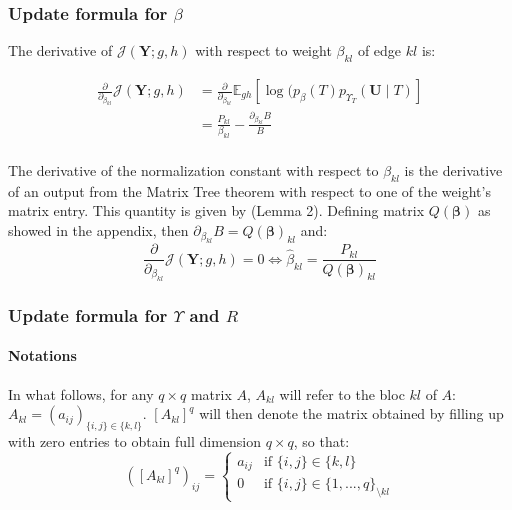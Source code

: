 \documentclass[11pt,a4paper]{article}
\newcommand{\betabf}{\boldsymbol{\beta}}
\newcommand{\Ybf}{\boldsymbol{Y}}
\newcommand{\Ubf}{\boldsymbol{U}}
\newcommand{\Esp}{\mathds{E}}
\begin{document}
 \subsubsection{Update formula for $\beta$}
 The derivative of $ \mathcal{J}(\Ybf ; g,h)$ with respect to weight $\beta_{kl}$ of edge $kl$ is:
 
 \begin{align*}
\frac{\partial}{\partial_{\beta_{kl}}} \mathcal{J}(\Ybf ; g,h) &=  \frac{\partial}{\partial_{\beta_{kl}}} \Esp_{gh} [\log (p_\beta(T)p_{\Upsilon_T}(\Ubf\mid T) ] \\
&= \frac{P_{kl}}{\beta_{kl}} - \frac{\partial_{\beta_{kl}} B }{B} \\
\end{align*}

The derivative of the normalization constant with respect to $\beta_{kl}$ is the derivative of an output from the Matrix Tree theorem with respect to one of the weight's matrix entry. This quantity is given by \citet{Meila} (Lemma 2). Defining matrix $Q(\betabf)$ as showed in the appendix, then $\partial_{\beta_{kl}} B = Q(\betabf)_{kl}$ and:
$$\frac{\partial}{\partial_{\beta_{kl}}} \mathcal{J}(\Ybf ; g,h) 
=0 \iff  \boxed{\widehat{\beta}_{kl} = \frac{P_{kl}}{ Q(\betabf)_{kl}} }$$

 \subsubsection{Update formula for $\Upsilon$ and $R$}
 \paragraph{Notations\\}
In what follows, for any $q\times q$  matrix $A$, $A_{kl}$ will refer to the bloc $kl$ of $A$: $A_{kl}=(a_{ij})_{\{i,j\}\in\{k,l\}}$.   $[A_{kl}]^q$ will then denote the matrix obtained by filling up with zero entries to obtain full dimension $q\times q$, so that:
$$([A_{kl}]^q )_{ij}=\left\{ \begin{array}{rl}
a_{ij} & \text{if } \{i,j\}\in\{k,l\}\\
0 &  \text{if } \{i,j\}\in\{1,..., q\}_{\setminus kl}
\end{array}\right.$$

 
\end{document}
